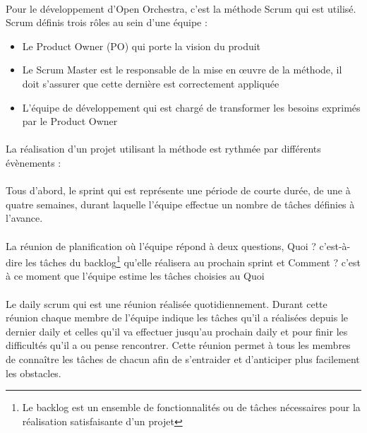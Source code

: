 \paragraph{}
Pour le développement d'Open Orchestra, c'est la méthode Scrum qui est utilisé. Scrum définis trois rôles au sein d'une équipe : 
\begin{itemize}
\item  Le \og Product Owner (PO) \fg{} qui porte la vision du produit
\item Le \og Scrum Master \fg{} est le responsable de la mise en œuvre de la méthode, il doit s'assurer que cette dernière est correctement appliquée
\item L'équipe de développement qui est chargé de transformer les besoins exprimés par le Product Owner
\end{itemize}
\paragraph{}
La réalisation d'un projet utilisant la méthode est rythmée par différents évènements : 
\paragraph{}
Tous d'abord, le sprint qui est représente une période de courte durée, de une à quatre semaines, durant laquelle l'équipe effectue un nombre de tâches définies à l'avance.
 \paragraph{}
 La réunion de planification où l'équipe répond à deux questions, \og Quoi ? \fg{} c'est-à-dire les tâches du backlog\footnote{Le backlog est un ensemble de fonctionnalités ou de tâches nécessaires pour la réalisation satisfaisante d'un projet} qu'elle réalisera au prochain sprint et \og Comment ? \fg{} c'est à ce moment que l'équipe estime les tâches choisies au \og Quoi \fg{} 

 \paragraph{}
Le \og daily scrum \fg{} qui est une réunion réalisée quotidiennement. Durant cette réunion chaque membre de l'équipe indique les tâches qu'il a réalisées depuis le dernier daily et celles qu'il va effectuer jusqu'au prochain daily et pour finir les difficultés qu'il a ou pense rencontrer.
Cette réunion permet à tous les membres de connaître les tâches de chacun afin de s'entraider et d'anticiper plus facilement les obstacles.
